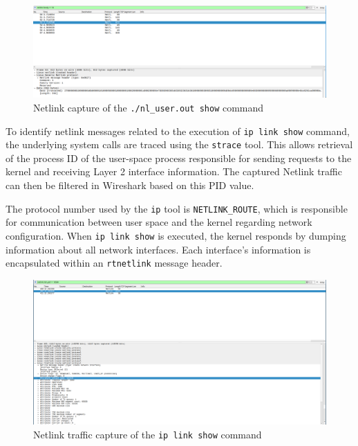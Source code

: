\documentclass[10pt, letterpaper]{article}
\begin{document}
\begin{figure}[ht]
	\centering
	\includegraphics[width=1\textwidth]{./images/raw_hex.png}
	\caption{Netlink capture of the \texttt{./nl\_user.out show} command}
\end{figure}

To identify netlink messages related to the execution of \texttt{ip link show} command,
the underlying system calls are traced using the \texttt{strace} tool. This allows
retrieval of the process ID of the user-space process responsible for sending
requests to the kernel and receiving Layer 2 interface information. The captured Netlink
traffic can then be filtered in Wireshark based on this PID value.

The protocol number used by the \texttt{ip} tool is \texttt{NETLINK\_ROUTE}, which is responsible
for communication between user space and the kernel regarding network configuration. When
\texttt{ip link show} is executed, the kernel responds by dumping information about all
network interfaces. Each interface's information is encapsulated within an
\texttt{rtnetlink} message header.

\begin{figure}[ht]
	\centering
	\includegraphics[width=1\textwidth]{./images/ip_link_show_capture.png}
	\caption{Netlink traffic capture of the \texttt{ip link show} command}
\end{figure}
\end{document}
